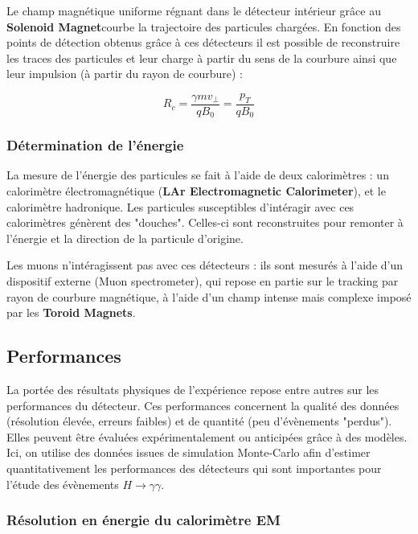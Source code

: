 \documentclass[11pt]{article} %
\begin{document}
Le champ magnétique uniforme régnant dans le détecteur  intérieur  grâce au \textbf{Solenoid Magnet}courbe la trajectoire des particules chargées. En fonction des points de détection obtenus grâce à ces détecteurs il est possible de reconstruire les traces des particules et leur charge à partir du sens de la courbure ainsi que leur impulsion (à partir du rayon de courbure) :

\begin{equation} 
R_c = \dfrac{\gamma mv_{\perp}}{qB_0} = \dfrac{p_{T}}{qB_0}
\end{equation}

\subsubsection{Détermination de l'énergie}

La mesure de l'énergie des particules se fait à l'aide de deux calorimètres : un calorimètre électromagnétique (\textbf{LAr Electromagnetic Calorimeter}), et le calorimètre hadronique. Les particules susceptibles d'intéragir avec ces calorimètres génèrent des "douches". Celles-ci sont reconstruites pour remonter à l'énergie et la direction de la particule d'origine.

Les muons n'intéragissent pas avec ces détecteurs : ils sont mesurés à l'aide d'un dispositif externe (Muon spectrometer), qui repose en partie sur le tracking par rayon de courbure magnétique, à l'aide d'un champ intense mais complexe imposé par les \textbf{Toroid Magnets}.

\subsection{Performances}

La portée des résultats physiques de l'expérience repose entre autres sur les performances du détecteur. Ces performances concernent la qualité des données (résolution élevée, erreurs faibles) et de quantité (peu d'évènements "perdus"). Elles peuvent être évaluées expérimentalement ou anticipées grâce à des modèles. Ici, on utilise des données issues de simulation Monte-Carlo afin d'estimer quantitativement les performances des détecteurs qui sont importantes pour l'étude des évènements $H \to \gamma \gamma$.

\subsubsection{Résolution en énergie du calorimètre EM}
\end{document}
